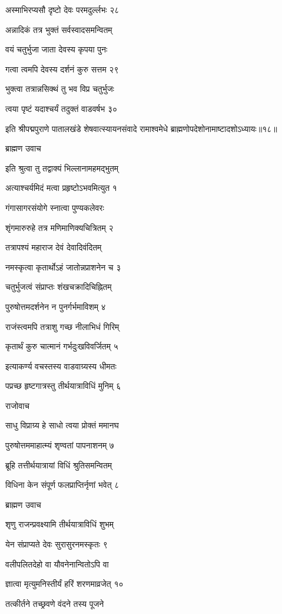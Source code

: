 अस्माभिरप्यसौ दृष्टो देवः परमदुर्ल्लभः २८

अन्नादिकं तत्र भुक्तं सर्वस्वादसमन्वितम्

वयं चतुर्भुजा जाता देवस्य कृपया पुनः

गत्वा त्वमपि देवस्य दर्शनं कुरु सत्तम २९

भुक्त्वा तत्रान्नसिक्थं तु भव विप्र चतुर्भुजः

त्वया पृष्टं यदाश्चर्यं तदुक्तं वाडवर्षभ ३०

इति श्रीपद्मपुराणे पातालखंडे शेषवात्स्यायनसंवादे रामाश्वमेधे ब्राह्मणोपदेशोनामाष्टादशोऽध्यायः॥१८॥


ब्राह्मण उवाच

इति श्रुत्वा तु तद्वाक्यं भिल्लानामहमद्भुतम्

अत्याश्चर्यमिदं मत्वा प्रहृष्टोऽभवमित्युत १

गंगासागरसंयोगे स्नात्वा पुण्यकलेवरः

शृंगमारुरुहे तत्र मणिमाणिक्यचित्रितम् २

तत्रापश्यं महाराज देवं देवादिवंदितम्

नमस्कृत्वा कृतार्थोऽहं जातोन्नप्राशनेन च ३

चतुर्भुजत्वं संप्राप्तः शंखचक्रादिचिह्नितम्

पुरुषोत्तमदर्शनेन न पुनर्गर्भमाविशम् ४

राजंस्त्वमपि तत्राशु गच्छ नीलाभिधं गिरिम्

कृतार्थं कुरु चात्मानं गर्भदुःखविवर्जितम् ५

इत्याकर्ण्य वचस्तस्य वाडवाग्र्यस्य धीमतः

पप्रच्छ हृष्टगात्रस्तु तीर्थयात्राविधिं मुनिम् ६

राजोवाच

साधु विप्राग्र्य हे साधो त्वया प्रोक्तं ममानघ

पुरुषोत्तममाहात्म्यं शृण्वतां पापनाशनम् ७

ब्रूहि तत्तीर्थयात्रायां विधिं श्रुतिसमन्वितम्

विधिना केन संपूर्ण फलप्राप्तिर्नृणां भवेत् ८

ब्राह्मण उवाच

शृणु राजन्प्रवक्ष्यामि तीर्थयात्राविधिं शुभम्

येन संप्राप्यते देवः सुरासुरनमस्कृतः ९

वलीपलितदेहो वा यौवनेनान्वितोऽपि वा

ज्ञात्वा मृत्युमनिस्तीर्यं हरिं शरणमाव्रजेत् १०

तत्कीर्तने तच्छ्रवणे वंदने तस्य पूजने

